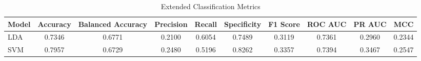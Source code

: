 \begin{table}[htbp]
\caption{Extended Classification Metrics}
\label{tab:perf_extended}
\centering
\begin{tabular}{lccccccccc}
\toprule
Model & Accuracy & Balanced Accuracy & Precision & Recall & Specificity & F1 Score & ROC AUC & PR AUC & MCC \\
\midrule
LDA & 0.7346 & 0.6771 & 0.2100 & 0.6054 & 0.7489 & 0.3119 & 0.7361 & 0.2960 & 0.2344 \\
SVM & 0.7957 & 0.6729 & 0.2480 & 0.5196 & 0.8262 & 0.3357 & 0.7394 & 0.3467 & 0.2547 \\
\bottomrule
\end{tabular}
\end{table}
